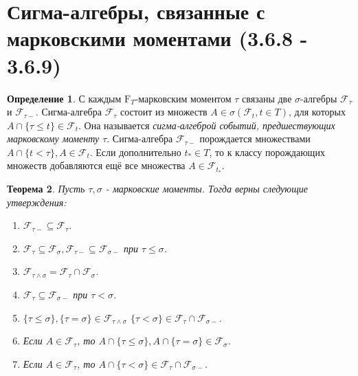 \documentclass[16pt]{article}
\newtheorem{theorem}{Теорема}[section]
\theoremstyle{definition}
\newtheorem{definition}[theorem]{Определение}
\begin{document}
\section{Сигма-алгебры, связанные с марковскими моментами (3.6.8 - 3.6.9)}
\begin{definition}
С каждым $\mathrm{F}_T$-марковским моментом $\tau$ связаны две $\sigma$-алгебры $\mathcal{F}_\tau$ и $\mathcal{F}_{\tau-}$. \newline
Сигма-алгебра $\mathcal{F}_\tau$ состоит из множеств $A \in \sigma(\mathcal{F}_t, t \in T)$, для которых $A \cap \{\tau \le t\} \in \mathcal{F}_t$. Она называется \textit{сигма-алгеброй событий, предшествующих марковскому моменту $\tau$}. \newline
Сигма-алгебра $\mathcal{F}_{\tau-}$ порождается множествами $A \cap \{t < \tau\}, A \in \mathcal{F}_t$. Если дополнительно $t_* \in T$, то к классу порождающих множеств добавляются ещё все множества $A \in \mathcal{F}_{t_*}$.
\end{definition}
\begin{theorem}
Пусть $\tau, \sigma$ - марковские моменты. Тогда верны следующие утверждения:
\begin{enumerate}
    \item $\mathcal{F}_{\tau-} \subseteq \mathcal{F}_\tau$.
    \item $\mathcal{F}_{\tau} \subseteq \mathcal{F}_\sigma, \mathcal{F}_{\tau-} \subseteq \mathcal{F}_{\sigma-}$ при $\tau \le \sigma$.
    \item $\mathcal{F}_{\tau \wedge \sigma} = \mathcal{F}_\tau \cap \mathcal{F}_\sigma$.
    \item $\mathcal{F}_{\tau} \subseteq \mathcal{F}_{\sigma-}$ при $\tau < \sigma$.
    \item $\{\tau \le \sigma\}, \{\tau = \sigma\} \in \mathcal{F}_{\tau \wedge \sigma}$ \newline $\{\tau < \sigma\} \in \mathcal{F}_\tau \cap \mathcal{F}_{\sigma-}$.
    \item Если $A \in \mathcal{F}_\tau$, то $A \cap \{\tau \le \sigma\}, A \cap \{\tau = \sigma\} \in \mathcal{F}_\sigma$.
    \item Если $A \in \mathcal{F}_\tau$, то $A \cap \{\tau < \sigma\} \in \mathcal{F}_\tau \cap \mathcal{F}_{\sigma-}$.
\end{enumerate}
\end{theorem}
\end{document}
